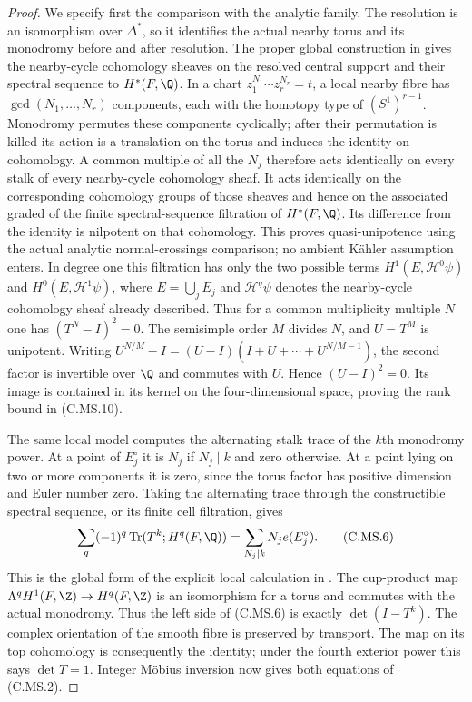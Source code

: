 \begin{proof}
We specify first the comparison with the analytic
family. The resolution is an isomorphism over
$\Delta^*$, so it identifies the actual nearby
torus and its monodromy before and after resolution.
The proper global construction in
\cite[\S2, pp.~237--243, and \S3]{ACampo1975}
gives the nearby-cycle cohomology sheaves on the
resolved central support and their spectral sequence
to $H^*(F,\Q)$. In a chart
$z_1^{N_1}\cdots z_r^{N_r}=t$, a local nearby
fibre has $\gcd(N_1,\ldots,N_r)$ components,
each with the homotopy type of $(S^1)^{r-1}$.
Monodromy permutes these components cyclically;
after their permutation is killed its action
is a translation on the torus and induces the
identity on cohomology. A common multiple of all
the $N_j$ therefore acts identically on every
stalk of every nearby-cycle cohomology sheaf.
It acts identically on the corresponding
cohomology groups of those sheaves and hence
on the associated graded of the finite
spectral-sequence filtration of $H^*(F,\Q)$.
Its difference from the identity is nilpotent
on that cohomology. This proves quasi-unipotence
using the actual analytic normal-crossings
comparison; no ambient K\"ahler assumption enters.
In degree one this filtration has only the
two possible terms $H^1(E,\mathcal H^0\psi)$
and $H^0(E,\mathcal H^1\psi)$, where
$E=\bigcup_jE_j$ and $\mathcal H^q\psi$
denotes the nearby-cycle cohomology sheaf
already described. Thus for a
common multiplicity multiple $N$ one has
$(T^N-I)^2=0$. The semisimple order $M$
divides $N$, and $U=T^M$ is unipotent.
Writing
$U^{N/M}-I=(U-I)(I+U+\cdots+U^{N/M-1})$,
the second factor is invertible over $\Q$
and commutes with $U$. Hence $(U-I)^2=0$.
Its image is contained in its kernel on
the four-dimensional space, proving
the rank bound in (C.MS.10).

The same local model computes the alternating
stalk trace of the $k$th monodromy power. At a
point of $E_j^\circ$ it is $N_j$ if $N_j\mid k$
and zero otherwise. At a point lying on two or
more components it is zero, since the torus
factor has positive dimension and Euler number
zero. Taking the alternating trace through the
constructible spectral sequence, or its finite
cell filtration, gives
\[
 \sum_q(-1)^q\operatorname{Tr}
             (T^k;H^q(F,\Q))
       =\sum_{N_j\mid k}N_j e(E_j^\circ).
 \tag{C.MS.6}
\]
This is the global form of the explicit local
calculation in \cite[Theorem~1, p.~235,
and proof on pp.~243--244]{ACampo1975}.
The cup-product map
$\Lambda^qH^1(F,\Z)\to H^q(F,\Z)$ is an
isomorphism for a torus and commutes with the
actual monodromy. Thus the left side of
(C.MS.6) is exactly $\det(I-T^k)$.
The complex orientation of the smooth fibre
is preserved by transport. The map on its
top cohomology is consequently the identity;
under the fourth exterior power this says
$\det T=1$. Integer M\"obius inversion now
gives both equations of (C.MS.2).


\end{proof}
